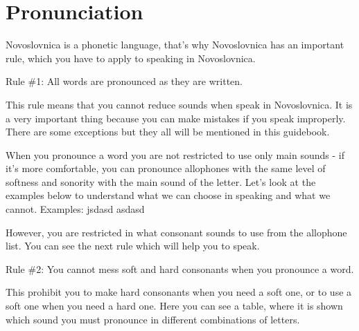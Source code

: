 \section{Pronunciation}

Novoslovnica is a phonetic language, that’s why Novoslovnica has an important rule, which you have to apply to speaking in Novoslovnica.

Rule \#1: All words are pronounced as they are written.

This rule means that you cannot reduce sounds when speak in Novoslovnica. It is a very important thing because you can make mistakes if you speak improperly. There are some exceptions but they all will be mentioned in this guidebook.

When you pronounce a word you are not restricted to use only main sounds - if it’s more comfortable, you can pronounce allophones with the same level of softness and sonority with the main sound of the letter. Let’s look at the examples below to understand what we can choose in speaking and what we cannot.
Examples:
jsdasd
asdasd

However, you are restricted in what consonant sounds to use from the allophone list. You can see the next rule which will help you to speak.

Rule \#2: You cannot mess soft and hard consonants when you pronounce a word.

This prohibit you to make hard consonants when you need a soft one, or to use a soft one when you need a hard one. Here you can see a table, where it is shown which sound you must pronounce in different combinations of letters.

